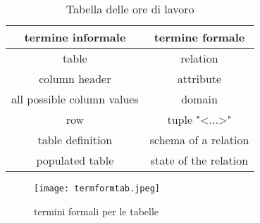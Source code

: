 \begin{table}[h!]
	\begin{center}
		\begin{tabular}{|c | c|} 
			\hline
			termine informale & termine formale \\ [0.5ex]
			\hline
 			table & relation \\
			column header & attribute \\
			all possible column values & domain \\
			row & tuple "<...>" \\\hline
			table definition & schema of a relation \\
			populated table & state of the relation \\
			\hline
		\end{tabular}
	\end{center}
	\caption{Tabella delle ore di lavoro}
	\label{taborelav}
\end{table}


\begin{figure}[H]
\centering
\texttt{[image: termformtab.jpeg]}
\caption{termini formali per le tabelle} 
\label{termformtab}
\end{figure}